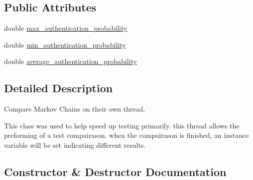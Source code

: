 \subsection*{Public Attributes}
\begin{DoxyCompactItemize}
\item 
double \hyperlink{classdata__analysis_1_1_model__compare__thread_a6213d96c54d70f9e8a2d01010414ecd3}{max\+\_\+authentication\+\_\+probability}
\item 
double \hyperlink{classdata__analysis_1_1_model__compare__thread_a8a9c58abe260de662f846876d4f7fed2}{min\+\_\+authentication\+\_\+probability}
\item 
double \hyperlink{classdata__analysis_1_1_model__compare__thread_a9a8a983509cfefb0d73b813f45fd2ef1}{average\+\_\+authentication\+\_\+probability}
\end{DoxyCompactItemize}


\subsection{Detailed Description}
Compare Markov Chains on their own thread. 

This class was used to help speed up testing primarily. this thread allows the preforming of a test compairason. when the compairason is finished, an instance variable will be set indicating different results. 

\subsection{Constructor \& Destructor Documentation}
